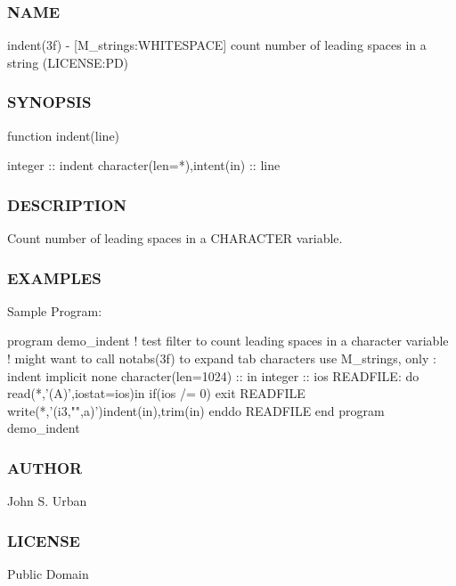 \subsubsection*{N\+A\+ME}

indent(3f) -\/ \mbox{[}M\+\_\+strings\+:W\+H\+I\+T\+E\+S\+P\+A\+CE\mbox{]} count number of leading spaces in a string (L\+I\+C\+E\+N\+SE\+:PD) 

\subsubsection*{S\+Y\+N\+O\+P\+S\+IS}

\begin{DoxyVerb}function indent(line)

 integer                        :: indent
 character(len=*),intent(in)    :: line
\end{DoxyVerb}
 \subsubsection*{D\+E\+S\+C\+R\+I\+P\+T\+I\+ON}

Count number of leading spaces in a C\+H\+A\+R\+A\+C\+T\+ER variable.

\subsubsection*{E\+X\+A\+M\+P\+L\+ES}

Sample Program\+: \begin{DoxyVerb} program demo_indent
 !  test filter to count leading spaces in a character variable
 !  might want to call notabs(3f) to expand tab characters
 use M_strings, only : indent
 implicit none
 character(len=1024) :: in
 integer             :: ios
    READFILE: do
       read(*,'(A)',iostat=ios)in
       if(ios /= 0) exit READFILE
       write(*,'(i3,"",a)')indent(in),trim(in)
    enddo READFILE
 end program demo_indent
\end{DoxyVerb}


\subsubsection*{A\+U\+T\+H\+OR}

John S. Urban \subsubsection*{L\+I\+C\+E\+N\+SE}

Public Domain \mbox{\label{namespacem__strings_aa94164439fc7659e175cf639e7315c0d}} 
